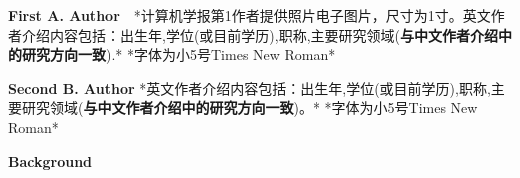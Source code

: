 \documentclass[10.5pt,compsoc,UTF8]{CjC}
\theoremstyle{mystyle}
\begin{document}
\begin{multicols}{1}
\begin{biography}
\noindent
\textbf{First A. Author}\ \ *计算机学报第1作者提供照片电子图片，尺寸为1寸。英文作者介绍内容包括：出生年,学位(或目前学历),职称,主要研究领域(\textbf{与中文作者介绍中的研究方向一致}).*
*字体为小5号Times New Roman*
\end{biography}

\begin{biography}
\noindent
\textbf{Second B. Author} *英文作者介绍内容包括：出生年,学位(或目前学历),职称,主要研究领域(\textbf{与中文作者介绍中的研究方向一致})。*
*字体为小5号Times New Roman*
\end{biography}
\end{multicols}


\begin{multicols}{1}
\noindent \textbf{Background}


\end{multicols}
\end{document}
